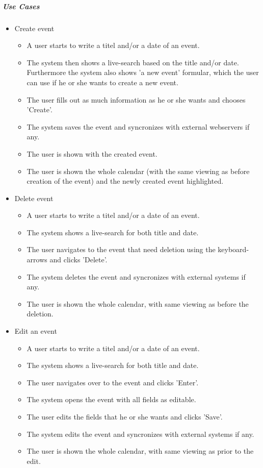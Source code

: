 \subparagraph{Use Cases}
   \begin{itemize}
   \item Create event
   	\begin{itemize}
   	\item A user starts to write a titel and/or a date of an event. 
   	\item The system then shows a live-search based on the title and/or date. Furthermore the system also shows 'a new event' formular, which the user can use if he or she wants to create a new event.   	
   	\item The user fills out as much information as he or she wants and chooses 'Create'.
   	\item The system saves the event and syncronizes with external webservers if any.
   	\item The user is shown with the created event. 
   	\item The user is shown the whole calendar (with the same viewing as before creation of the event) and the newly created event highlighted. 
   	\end{itemize}
   \item Delete event
   \begin{itemize}
   	\item  A user starts to write a titel and/or a date of an event. 
   	\item The system shows a live-search for both title and date. 
   	\item The user navigates to the event that need deletion using the keyboard-arrows and clicks 'Delete'. 
   	\item The system deletes the event and syncronizes with external systems if any.
   	\item The user is shown the whole calendar, with same viewing as before the deletion.
   	\end{itemize}
   \item Edit an event
    \begin{itemize}
   	\item A user starts to write a titel and/or a date of an event.
   	\item The system shows a live-search for both title and date. 
   	\item The user navigates over to the event and clicks 'Enter'. 
   	\item The system opens the event with all fields as editable. 
   	\item The user edits the fields that he or she wants and clicks 'Save'.
   	\item The system edits the event and syncronizes with external systems if any.
   	\item The user is shown the whole calendar, with same viewing as prior to the edit. 
   	\end{itemize}
   

\end{itemize}
